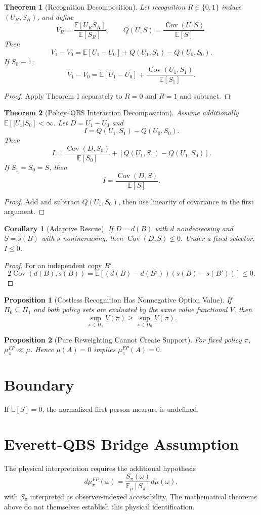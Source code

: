 \documentclass[11pt]{article}
\newtheorem{theorem}{Theorem}
\newtheorem{proposition}{Proposition}
\newtheorem{corollary}{Corollary}
\newcommand{\E}{\mathbb E}
\newcommand{\Cov}{\operatorname{Cov}}
\begin{document}
\begin{theorem}[Recognition Decomposition]
Let recognition $R\in\{0,1\}$ induce $(U_R,S_R)$, and define
\[
V_R=\frac{\E[U_RS_R]}{\E[S_R]},\qquad
Q(U,S)=\frac{\Cov(U,S)}{\E[S]}.
\]
Then
\[
V_1-V_0=\E[U_1-U_0]+Q(U_1,S_1)-Q(U_0,S_0).
\]
If $S_0\equiv1$,
\[
V_1-V_0=\E[U_1-U_0]+\frac{\Cov(U_1,S_1)}{\E[S_1]}.
\]
\end{theorem}
\begin{proof}
Apply Theorem 1 separately to $R=0$ and $R=1$ and subtract.
\end{proof}

\begin{theorem}[Policy--QBS Interaction Decomposition]
Assume additionally $\E[|U_1|S_0]<\infty$. Let $D=U_1-U_0$ and
\[
I=Q(U_1,S_1)-Q(U_0,S_0).
\]
Then
\[
I=
\frac{\Cov(D,S_0)}{\E[S_0]}
+
\left[Q(U_1,S_1)-Q(U_1,S_0)\right].
\]
If $S_1=S_0=S$, then
\[
I=\frac{\Cov(D,S)}{\E[S]}.
\]
\end{theorem}
\begin{proof}
Add and subtract $Q(U_1,S_0)$, then use linearity of covariance in the first argument.
\end{proof}

\begin{corollary}[Adaptive Rescue]
If $D=d(B)$ with $d$ nondecreasing and $S=s(B)$ with $s$ nonincreasing, then
$\Cov(D,S)\le0$. Under a fixed selector, $I\le0$.
\end{corollary}
\begin{proof}
For an independent copy $B'$,
\[
2\Cov(d(B),s(B))
=
\E[(d(B)-d(B'))(s(B)-s(B'))]\le0.
\]
\end{proof}

\begin{proposition}[Costless Recognition Has Nonnegative Option Value]
If $\Pi_0\subseteq\Pi_1$ and both policy sets are evaluated by the same value
functional $V$, then
\[
\sup_{\pi\in\Pi_1}V(\pi)\ge\sup_{\pi\in\Pi_0}V(\pi).
\]
\end{proposition}

\begin{proposition}[Pure Reweighting Cannot Create Support]
For fixed policy $\pi$, $\mu^{FP}_\pi\ll\mu$. Hence $\mu(A)=0$ implies
$\mu^{FP}_\pi(A)=0$.
\end{proposition}

\section{Boundary}
If $\E[S]=0$, the normalized first-person measure is undefined.

\section{Everett-QBS Bridge Assumption}
The physical interpretation requires the additional hypothesis
\[
d\mu^{FP}_\pi(\omega)
=
\frac{S_\pi(\omega)}{\E_\mu[S_\pi]}d\mu(\omega),
\]
with $S_\pi$ interpreted as observer-indexed accessibility. The mathematical
theorems above do not themselves establish this physical identification.
\end{document}
